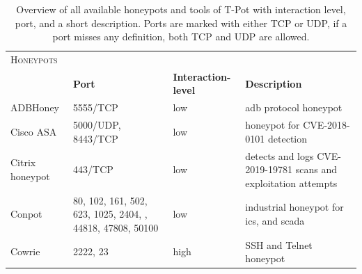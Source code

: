 \begin{table}
    \centering
    \caption[Overview of honeypots of T-Pot]{
        Overview of all available honeypots and tools of T-Pot with interaction level, port, and a short description.
        Ports are marked with either TCP or UDP, if a port misses any definition, both TCP and UDP are allowed.
    }
    \begin{tabularx}{\linewidth}{l|XlX}
        \toprule
        \textsc{Honeypots}                        & \multicolumn{3}{c}{}                                                                                                                                                                                                            \\
                                                  & \textbf{Port}                                                                                               & \textbf{Interaction-level} & \textbf{Description}                                                                 \\
        \hline
        ADBHoney \cite{adbhoney2021}              & 5555/TCP                                                                                                    & low                        & \ac{adb} protocol honeypot                                                           \\
        Cisco ASA \cite{cymmetria2018}            & 5000/UDP, 8443/TCP                                                                                          & low                        & honeypot for CVE-2018-0101\cite{CVE-2018-0101} detection                             \\
        Citrix honeypot \cite{citrixhoneypot2020} & 443/TCP                                                                                                     & low                        & detects and logs CVE-2019-19781\cite{CVE-2019-19781} scans and exploitation attempts \\
        Conpot \cite{conpot2021}                  & 80, 102, 161, 502, 623, 1025, 2404, \newline 10001, 44818, 47808, 50100                                     & low                        & industrial honeypot for \ac{ics}, and \ac{scada}                                     \\
        Cowrie \cite{cowrie2021}                  & 2222, 23                                                                                                    & high                       & SSH and Telnet honeypot                                                              \\

\end{tabularx}
\end{table}
